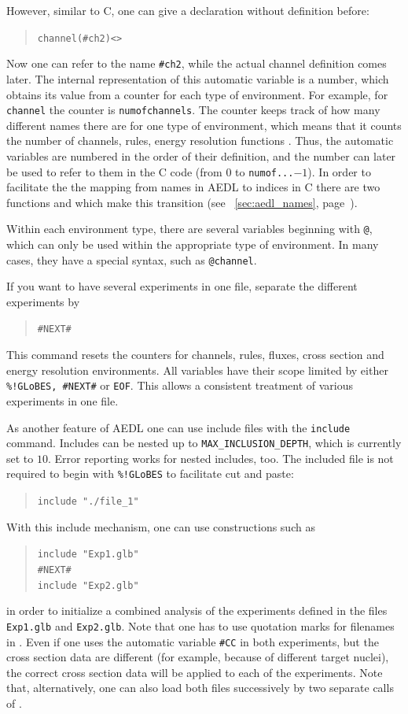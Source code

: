 However, similar to C, one can give a declaration without definition before:
\begin{quote}
{\tt    channel(\#ch2)<>}
\end{quote}
Now one can refer to the name {\tt \#ch2}, while the actual channel definition comes later. The internal representation of this automatic
variable is a number, which obtains its value from a counter for each type of environment. For example, for {\tt channel} the counter is {\tt numofchannels}. The counter keeps track of how many different names 
there are for one type of environment, which means that it counts the number of channels, rules, energy resolution functions \etc . Thus, the automatic
variables are numbered in the order of their definition, and the number
can later be used to refer to them in the C code (from $0$ to {\tt numof...}$-1$). In order to facilitate the the mapping from names in AEDL to indices
in C there are two functions  and  which
make this transition (see \Sec~\ref{sec:aedl_names}, 
page~\pageref{sec:aedl_names}).


Within each environment type, there are several 
variables beginning with {\tt @}, which can only be used within the 
appropriate type of environment. In many cases, 
they have a special syntax, such as {\tt @channel}.

If you want to have several experiments in one file, separate the different
 experiments by 
\begin{quote}
{\tt    \#NEXT\#}
\end{quote}
This command resets the counters for channels, rules, fluxes, cross section 
and energy resolution environments. All variables have their scope limited 
by either {\tt \%!GLoBES, \#NEXT\#} or {\tt EOF}.  This allows 
a consistent treatment of various experiments in one file.

As another feature of AEDL one can use include files with the {\tt include} command. Includes can be nested up to {\tt MAX\_INCLUSION\_DEPTH}, which is currently set to $10$. Error reporting works 
 for nested includes, too. The included file is not required to begin 
 with {\tt \%!GLoBES} to facilitate cut and paste:
\begin{quote}
{\tt include "./file\_1"}
\end{quote}
With this include mechanism, one can use constructions such as 
\begin{quote}
{\tt    include  "Exp1.glb"\\
        \#NEXT\#\\
        include   "Exp2.glb"
}
\end{quote}
in order to initialize a combined analysis of the experiments defined in the files {\tt Exp1.glb} and {\tt Exp2.glb}. Note that one has 
to use quotation marks for filenames in \AEDL.
Even if one uses the
automatic variable {\tt \#CC} in both experiments, 
but the cross section data are different (for example, because of different target nuclei), the correct 
cross section data will be applied to each of the experiments. 
Note that, alternatively, one can 
also load both files successively by two separate calls of 
. 

